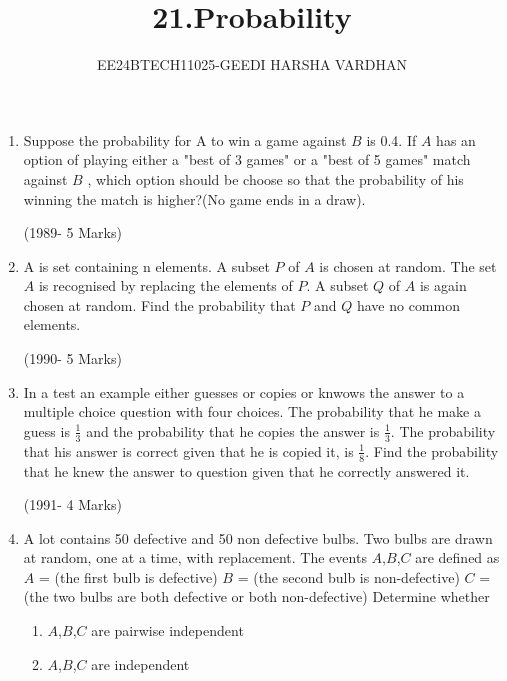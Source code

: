 \documentclass[journal,12pt,onecolumn]{IEEEtran}
\theoremstyle{remark}
\begin{document}

\vspace{3cm}

\title{21.Probability}
\author{EE24BTECH11025-GEEDI HARSHA VARDHAN}
\maketitle
\bigskip

\renewcommand{\thefigure}{\theenumi}
\renewcommand{\thetable}{\theenumi}




\begin{enumerate}
	\item Suppose the probability for $\text{A}$ to win a game against $B$ is 0.4. If $A$ has an option of playing either a "best of 3 games" or a "best of 5 games" match against $B$ , which option should be choose so that the probability of his winning the match is higher?(No game ends in a draw).

\hfill(1989- 5 Marks)

\item A is set containing n elements. A subset $P$ of $A$ is chosen at random. The set $A$ is recognised by replacing the elements of $P$. A subset $Q$ of $A$ is again chosen at random. Find the probability that $P$ and $Q$ have no common elements.


\hfill(1990- 5 Marks)

\item In a test an example either guesses or copies or knwows the answer to a multiple choice question with four choices. The probability that he make a guess is $\frac{1}{3}$ and the probability that he copies the answer is $\frac{1}{3}$. The probability that his answer is correct given that he is copied it, is $\frac{1}{8}$. Find the probability that he knew the answer to question given that he correctly answered it.

\hfill(1991- 4 Marks)



\item A lot contains 50 defective and 50 non defective bulbs. Two bulbs are drawn at random, one at a time, with replacement. The events $A$,$B$,$C$ are defined as 
$A$ = (the first bulb is defective)
$B$ = (the second bulb is non-defective)
$C$ = (the two bulbs are both defective or both non-defective)
Determine whether
\begin{enumerate}
\item $A$,$B$,$C$ are pairwise independent
\item $A$,$B$,$C$ are independent
\end{enumerate}


\end{enumerate}
\end{document}
